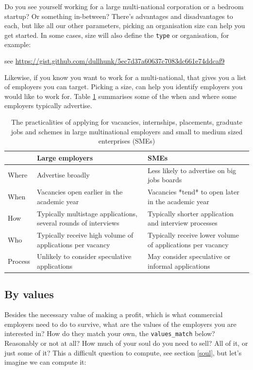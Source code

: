 \documentclass[
]{book}
\begin{document}
Do you see yourself working for a large multi-national corporation or a bedroom startup? Or something in-between? There's advantages and disadvantages to each, but like all our other parameters, picking an organisation size can help you get started. In some cases, size will also define the \texttt{type} or organisation, for example:

see \url{https://gist.github.com/dullhunk/5ec7d37a60637c7083dc661e74ddcaf9}

Likewise, if you know you want to work for a multi-national, that gives you a list of employers you can target. Picking a size, can help you identify employers you would like to work for. Table \ref{tab:shortcuts} summarises some of the when and where some employers typically advertise.

\begin{table}

\caption{\label{tab:shortcuts}The practicalities of applying for vacancies, internships, placements, graduate jobs and schemes in large multinational employers and small to medium sized enterprises (SMEs)}
\centering
\begin{tabular}[t]{lll}
\toprule
 & Large employers & SMEs\\
\midrule
Where & Advertise broadly & Less likely to advertise on big jobs boards\\
When & Vacancies open earlier in the academic year & Vacancies *tend* to open later in the academic year\\
How & Typically multistage applications, several rounds of interviews & Typically shorter application and interview processes\\
Who & Typically receive high volume of applications per vacancy & Typically receive lower volume of applications per vacancy\\
Process & Unlikely to consider speculative applications & May consider speculative or informal applications\\
\bottomrule
\end{tabular}
\end{table}

\hypertarget{by-values}{%
\subsection{By values}\label{by-values}}

Besides the necessary value of making a profit, which is what commercial employers need to do to survive, what are the values of the employers you are interested in? How do they match your own, the \texttt{values\_match} below? Reasonably or not at all? How much of your soul do you need to sell? All of it, or just some of it? This a difficult question to compute, see section \ref{soul}, but let's imagine we can compute it:
\end{document}
